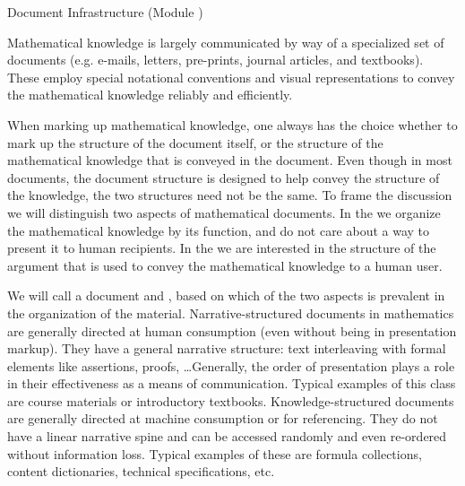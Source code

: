 
\begin{omgroup}[id=omdoc-infrastructure,short=Document Infrastructure]
                          {Document Infrastructure (Module {})}

\begin{module}[id=document-types]
Mathematical knowledge is largely communicated by way of a specialized set of documents
(e.g. e-mails, letters, pre-prints, journal articles, and textbooks).  These employ
special notational conventions and visual representations to convey the mathematical
knowledge reliably and efficiently.

When marking up mathematical knowledge, one always has the choice whether to mark up the
structure of the document itself, or the structure of the mathematical knowledge that is
conveyed in the document. Even though in most documents, the document structure is
designed to help convey the structure of the knowledge, the two structures need not be the
same.  To frame the discussion we will distinguish two aspects of mathematical
documents. In the {\emph{}} we organize the mathematical
knowledge by its function, and do not care about a way to present it to human
recipients. In the {\emph{}} we are interested in the
structure of the argument that is used to convey the mathematical knowledge to a human
user.

\begin{definition}[display=flow,id=knowledge-structured.def]
  We will call a document {} and
  {}, based on which of the two aspects is prevalent in the
  organization of the material.  Narrative-structured documents in mathematics are
  generally directed at human consumption (even without being in presentation
  markup). They have a general narrative structure: text interleaving with formal elements
  like assertions, proofs, \ldots Generally, the order of presentation plays a role in
  their effectiveness as a means of communication.  Typical examples of this class are
  course materials or introductory textbooks.  Knowledge-structured documents are
  generally directed at machine consumption or for referencing. They do not have a linear
  narrative spine and can be accessed randomly and even re-ordered without information
  loss.  Typical examples of these are formula collections, {\openmath} content
  dictionaries, technical specifications, etc.
\end{definition}


\end{module}
\end{omgroup}
